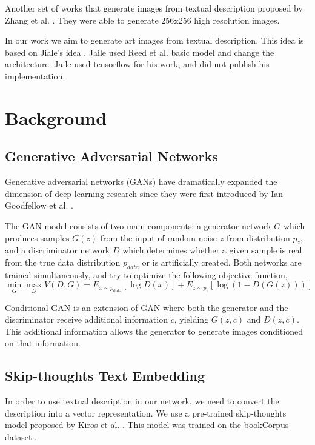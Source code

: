 \documentclass[a4paper]{article}
\begin{document}
Another set of works that generate images from textual description proposed by Zhang et al. \cite{zhang2017stackgan,zhang2017stackgan++}. They were able to generate 256x256 high resolution images.

In our work we aim to generate art images from textual description. This idea is based on Jiale's idea \cite{Zhi2017PixelBrush}. Jaile used Reed et al. \cite{reed2016generative} basic model and change the architecture. Jaile used tensorflow for his work, and did not publish his implementation.

\section{Background}
\subsection{Generative Adversarial Networks}
Generative adversarial networks (GANs) have dramatically expanded the dimension of deep learning research since they were first introduced by Ian Goodfellow et al. \cite{goodfellow2014generative}.

The GAN model consists of two main components: a generator network \(G\) which produces samples \(G(z)\) from the input of random noise \(z\) from distribution \(p_z\), and a discriminator network \(D\) which determines whether a given sample is real from the true data distribution \(p_{data}\) or is artificially created. Both networks are trained simultaneously, and try to optimize the following objective function,
\begin{equation}
    \min_{G}\max_{D}{V(D,G)} = E_{x \sim p_{\mathrm{data}}} [\log{D(x)}] + E_{z \sim p_z} [\log(1-D(G(z)))]
\end{equation}

Conditional GAN \cite{mirza2014conditional} is an extension of GAN where both the generator and the discriminator receive additional information \(c\), yielding \(G(z,c)\) and \(D(z,c)\). This additional information allows the generator to generate images conditioned on that information.

\subsection{Skip-thoughts Text Embedding}
In order to use textual description in our network, we need to convert the description into a vector representation. We use a pre-trained skip-thoughts model proposed by Kiros et al. \cite{kiros2015skip}. This model was trained on the bookCorpus dataset \cite{zhu2015aligning}. 
\end{document}
